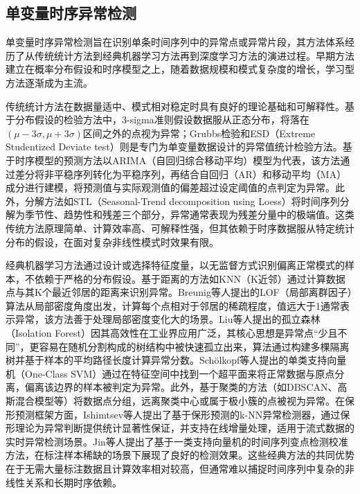 \subsection{单变量时序异常检测}

单变量时序异常检测旨在识别单条时间序列中的异常点或异常片段，其方法体系经历了从传统统计方法到经典机器学习方法再到深度学习方法的演进过程\cite{chandola2009anomaly,braei2020anomaly,blazquez2021review,chen2025tsadsurvey}。早期方法建立在概率分布假设和时序模型之上，随着数据规模和模式复杂度的增长，学习型方法逐渐成为主流。

传统统计方法在数据量适中、模式相对稳定时具有良好的理论基础和可解释性。基于分布假设的检验方法中，3-sigma准则假设数据服从正态分布，将落在$(\mu-3\sigma, \mu+3\sigma)$区间之外的点视为异常；Grubbs检验和ESD（Extreme Studentized Deviate test）则是专门为单变量数据设计的异常值统计检验方法\cite{chen2025tsadsurvey}。基于时序模型的预测方法以ARIMA（自回归综合移动平均）模型\cite{box1970arima}为代表，该方法通过差分将非平稳序列转化为平稳序列，再结合自回归（AR）和移动平均（MA）成分进行建模，将预测值与实际观测值的偏差超过设定阈值的点判定为异常。此外，分解方法如STL（Seasonal-Trend decomposition using Loess）\cite{cleveland1990stl}将时间序列分解为季节性、趋势性和残差三个部分，异常通常表现为残差分量中的极端值。这类传统方法原理简单、计算效率高、可解释性强，但其依赖于时序数据服从特定统计分布的假设，在面对复杂非线性模式时效果有限。

经典机器学习方法通过设计或选择特征度量，以无监督方式识别偏离正常模式的样本，不依赖于严格的分布假设。基于距离的方法如KNN（K近邻）通过计算数据点与其K个最近邻居的距离来识别异常。Breunig等人\cite{breunig2000lof}提出的LOF（局部离群因子）算法从局部密度角度出发，计算每个点相对于邻居的稀疏程度，值远大于1通常表示异常，该方法善于处理局部密度变化大的场景。Liu等人\cite{liu2008isolation}提出的孤立森林（Isolation Forest）因其高效性在工业界应用广泛，其核心思想是异常点``少且不同''，更容易在随机分割构成的树结构中被快速孤立出来，算法通过构建多棵隔离树并基于样本的平均路径长度计算异常分数。Sch{\"o}lkopf等人\cite{scholkopf2001ocsvm}提出的单类支持向量机（One-Class SVM）通过在特征空间中找到一个超平面来将正常数据与原点分离，偏离该边界的样本被判定为异常。此外，基于聚类的方法（如DBSCAN\cite{ester1996dbscan}、高斯混合模型等）将数据点分组，远离聚类中心或属于极小簇的点被视为异常。在保形预测框架方面，Ishimtsev等人\cite{ishimtsev2017conformal}提出了基于保形预测的k-NN异常检测器，通过保形理论为异常判断提供统计显著性保证，并支持在线增量处理，适用于流式数据的实时异常检测场景。Jin等人\cite{jin2019ocsvm}提出了基于一类支持向量机的时间序列变点检测校准方法，在标注样本稀缺的场景下展现了良好的检测效果。这些经典方法的共同优势在于无需大量标注数据且计算效率相对较高，但通常难以捕捉时间序列中复杂的非线性关系和长期时序依赖\cite{schmidl2022anomaly}。

